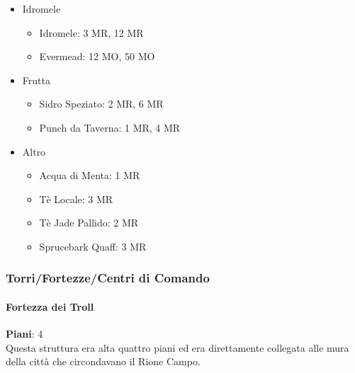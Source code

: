\documentclass{article}
\begin{document}
\begin{itemize}
\begin{itemize}
                    \item Idromele
                    \begin{itemize}
                        \item Idromele: 3 MR, 12 MR
                        \item Evermead: 12 MO, 50 MO
                    \end{itemize}

                    \item Frutta
                    \begin{itemize}
                        \item Sidro Speziato: 2 MR, 6 MR
                        \item Punch da Taverna: 1 MR, 4 MR
                    \end{itemize}

                    \item Altro
                    \begin{itemize}
                        \item Acqua di Menta: 1 MR
                        \item Tè Locale: 3 MR
                        \item Tè Jade Pallido: 2 MR
                        \item Sprucebark Quaff: 3 MR
                    \end{itemize}
                    \end{itemize}
                    \end{itemize}



              \subsubsection{Torri/Fortezze/Centri di Comando}

                  \paragraph{Fortezza dei Troll}
                  \textbf{Piani}: 4\\
                    Questa struttura era alta quattro piani ed era direttamente collegata alle mura della città che circondavano il Rione Campo.
\end{document}
